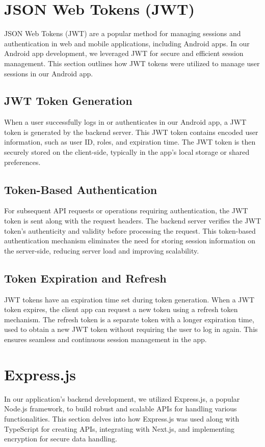 \section{JSON Web Tokens (JWT)}

JSON Web Tokens (JWT) are a popular method for managing sessions and authentication in web and mobile applications, including Android apps. In our Android app development, we leveraged JWT for secure and efficient session management. This section outlines how JWT tokens were utilized to manage user sessions in our Android app.

\subsection{JWT Token Generation}

When a user successfully logs in or authenticates in our Android app, a JWT token is generated by the backend server. This JWT token contains encoded user information, such as user ID, roles, and expiration time. The JWT token is then securely stored on the client-side, typically in the app's local storage or shared preferences.

\subsection{Token-Based Authentication}

For subsequent API requests or operations requiring authentication, the JWT token is sent along with the request headers. The backend server verifies the JWT token's authenticity and validity before processing the request. This token-based authentication mechanism eliminates the need for storing session information on the server-side, reducing server load and improving scalability.

\subsection{Token Expiration and Refresh}

JWT tokens have an expiration time set during token generation. When a JWT token expires, the client app can request a new token using a refresh token mechanism. The refresh token is a separate token with a longer expiration time, used to obtain a new JWT token without requiring the user to log in again. This ensures seamless and continuous session management in the app.


\section{Express.js}
In our application's backend development, we utilized Express.js, a popular Node.js framework, to build robust and scalable APIs for handling various functionalities. This section delves into how Express.js was used along with TypeScript for creating APIs, integrating with Next.js, and implementing encryption for secure data handling.

